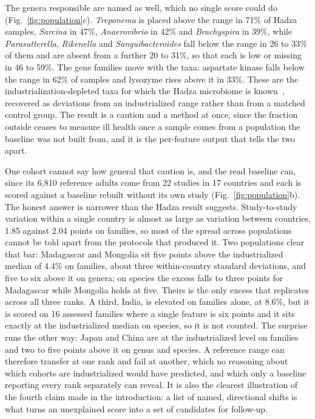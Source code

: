 \documentclass[conference]{IEEEtran}
\begin{document}
The genera responsible are named as well, which no single score could do (Fig.~\ref{fig:population}c). \textit{Treponema} is placed above the range in 71\% of Hadza samples, \textit{Sarcina} in 47\%, \textit{Anaerovibrio} in 42\% and \textit{Brachyspira} in 39\%, while \textit{Parasutterella}, \textit{Rikenella} and \textit{Sanguibacteroides} fall below the range in 26 to 33\% of them and are absent from a further 20 to 31\%, so that each is low or missing in 46 to 59\%. The gene families move with the taxa: aspartate kinase falls below the range in 62\% of samples and lysozyme rises above it in 33\%. These are the industrialization-depleted taxa for which the Hadza microbiome is known~\cite{carter2023}, recovered as deviations from an industrialized range rather than from a matched control group. The result is a caution and a method at once, since the fraction outside ceases to measure ill health once a sample comes from a population the baseline was not built from, and it is the per-feature output that tells the two apart.

One cohort cannot say how general that caution is, and the read baseline can, since its 6{,}810 reference adults come from 22 studies in 17 countries and each is scored against a baseline rebuilt without its own study (Fig.~\ref{fig:population}b). The honest answer is narrower than the Hadza result suggests. Study-to-study variation within a single country is almost as large as variation between countries, 1.85 against 2.04 points on families, so most of the spread across populations cannot be told apart from the protocols that produced it. Two populations clear that bar: Madagascar and Mongolia sit five points above the industrialized median of 4.4\% on families, about three within-country standard deviations, and five to six above it on genera; on species the excess falls to three points for Madagascar while Mongolia holds at five. Theirs is the only excess that replicates across all three ranks. A third, India, is elevated on families alone, at 8.6\%, but it is scored on 16 assessed families where a single feature is six points and it sits exactly at the industrialized median on species, so it is not counted. The surprise runs the other way: Japan and China are at the industrialized level on families and two to five points above it on genus and species. A reference range can therefore transfer at one rank and fail at another, which no reasoning about which cohorts are industrialized would have predicted, and which only a baseline reporting every rank separately can reveal. It is also the clearest illustration of the fourth claim made in the introduction: a list of named, directional shifts is what turns an unexplained score into a set of candidates for follow-up.
\end{document}
